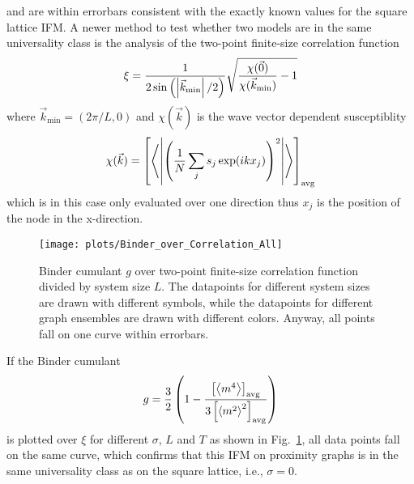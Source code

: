 and are within errorbars consistent with the exactly known values for the
square lattice IFM.
A newer method \cite{chiCollapse,Hartmann2013} to test whether two models are in
the same universality class is the analysis of the two-point finite-size
correlation function
\[\xi = \frac{1}{2\sin\left(\left\vert\vec{k}_{\mathrm{min}}\right\vert/2\right)} \sqrt{\frac{\chi(\vec{0})}{\chi(\vec{k}_{\mathrm{min}})} - 1}\]
where $\vec{k}_{\mathrm{min}}=(2\pi / L, 0)$ and $\chi(\vec{k})$ is the wave vector
dependent susceptiblity
\[\chi(\vec{k}) = \left[ \left< \left\vert\left(\frac{1}{N}\sum_j s_j \exp(ikx_j)\right)^2\right\vert \right> \right] _{\mathrm{avg}}\]
which is in this case only evaluated over one direction thus $x_j$ is the
position of the node in the x-direction.

\begin{figure}[htbp]
    \centering
    \texttt{[image: plots/Binder\_over\_Correlation\_All]}
    \caption[Binder cumulant over two-point finite-size correlation function divided by system size]
    {
        Binder cumulant $g$ over two-point finite-size correlation function
        divided by system size $L$. The datapoints for different system sizes
        are drawn with different symbols, while the datapoints for different
        graph ensembles are drawn with different colors. Anyway, all points
        fall on one curve within errorbars.
    }
    \label{fig:binderOverCorr}
\end{figure}
If the Binder cumulant
\[g = \frac{3}{2}\left(1-\frac{\left[ \left< m^4 \right> \right] _{\mathrm{avg}}}{3\left[ \left< m^2 \right>^2 \right] _{\mathrm{avg}}}\right)\]
is plotted over $\xi$ for different $\sigma$, $L$ and $T$ as shown in
Fig.~\ref{fig:binderOverCorr}, all data points fall on the
same curve, which confirms that this IFM on proximity graphs is in the
same universality class as on the square lattice, i.e., $\sigma=0$.

